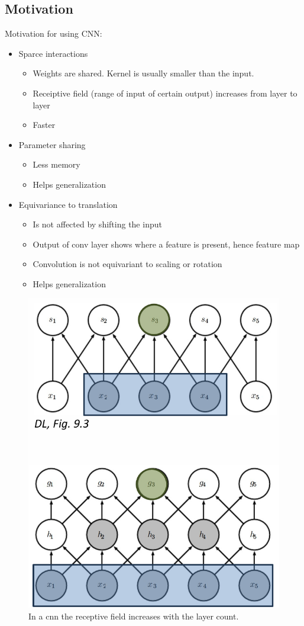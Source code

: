 \documentclass[../Main.tex]{subfiles}
\begin{document}
\subsection{Motivation}
Motivation for using CNN:
\begin{itemize}
    \item Sparce interactions
    \begin{itemize}
        \item Weights are shared. Kernel is usually smaller than the input.
        \item Receiptive field (range of input of certain output) increases from layer to layer
        \item Faster
    \end{itemize}
    \item Parameter sharing
    \begin{itemize}
        \item Less memory
        \item Helps generalization
    \end{itemize}
    \item Equivariance to translation
    \begin{itemize}
        \item Is not affected by shifting the input
        \item Output of conv layer shows where a feature is present, hence feature map
        \item Convolution is not equivariant to scaling or rotation
        \item Helps generalization
    \end{itemize}
\end{itemize}

\begin{figure}[H]
    \centering
    \includegraphics[width=0.5\linewidth]{Images/deepl/receptive-field.png}
    \caption{In a cnn the receptive field increases with the layer count.}
\end{figure}
\end{document}

